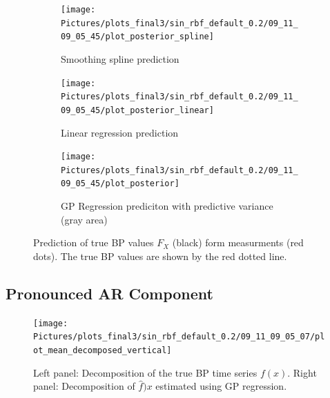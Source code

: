 \begin{figure}[!ht]
\centering

\begin{subfigure}{.45\textwidth}
    \centering
    \texttt{[image: Pictures/plots\_final3/sin\_rbf\_default\_0.2/09\_11\_09\_05\_45/plot\_posterior\_spline]}
  \caption[Spline]{Smoothing spline prediction}
  \label{fig:ex1-spline}
\end{subfigure}\hfill
\begin{subfigure}{.45\textwidth}
    \centering
    \texttt{[image: Pictures/plots\_final3/sin\_rbf\_default\_0.2/09\_11\_09\_05\_45/plot\_posterior\_linear]}
  \caption[Linear Regression]{Linear regression prediction}
  \label{fig:ex1-linear}
\end{subfigure}
\begin{subfigure}{0.6\textwidth}
    \centering
    \texttt{[image: Pictures/plots\_final3/sin\_rbf\_default\_0.2/09\_11\_09\_05\_45/plot\_posterior]}
  \caption[GP Prediction]{GP Regression prediciton with predictive variance (gray area)}
  \label{fig:ex1-spline}
\end{subfigure}
\caption[True BP value prediction]{Prediction of true BP values $F_X$ (black) form measurments (red dots). The true BP values are shown
by the red dotted line. }
\label{fig:ex1}
\end{figure}


\subsection{Pronounced AR Component}

\begin{figure}[!ht]
\centering
    \texttt{[image: Pictures/plots\_final3/sin\_rbf\_default\_0.2/09\_11\_09\_05\_07/plot\_mean\_decomposed\_vertical]}
\caption[Decomposed BP time sereis]{Left panel: Decomposition of the true BP time series $f(x)$. Right panel:
Decomposition of $\hat{f})x$ estimated using GP regression.}
\label{fig:ex2-gp-prediction}
\end{figure}

